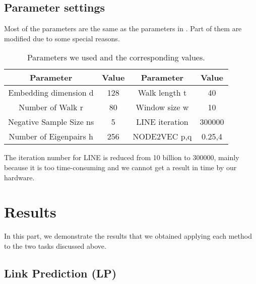 \documentclass[a4paper]{article}
\begin{document}
\subsection{Parameter settings}
\noindent Most of the parameters are the same as the parameters in \cite{1}. Part of them are modified due to some special reasons.
\begin{table}[H]
    \centering
\begin{tabular}{c|c|c|c}
\toprule  
Parameter& Value& Parameter &Value\\
\midrule  
Embedding dimension d & 128& Walk length t&40\\
Number of Walk r& 80& Window size w& 10\\
Negative Sample Size ns & 5& LINE iteration& 300000\\
Number of Eigenpairs h & 256& NODE2VEC p,q& 0.25,4\\
\bottomrule 
\end{tabular}
\caption{Parameters we used and the corresponding values.}
\end{table}
\noindent The iteration number for LINE is reduced from 10 billion to 300000, mainly because it is too time-consuming and we cannot get a result in time by our hardware.



\section{Results}

\noindent In this part, we demonstrate the results that we obtained applying each method to the two tasks discussed above. 


%

\subsection{Link Prediction (LP)}
\end{document}
